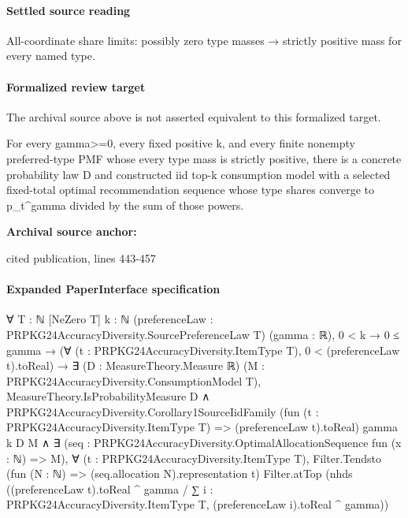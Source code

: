\documentclass[10pt]{article}
\begin{document}
\paragraph{Settled source reading}
\begin{sloppypar}
All-\allowbreak{}coordinate share limits:\allowbreak{} possibly zero type masses → strictly positive mass for every named type.\allowbreak{}
\end{sloppypar}
\paragraph{Formalized review target}
The archival source above is not asserted equivalent to this formalized target.
\begin{ReviewVerbatim}
For every gamma>=0, every fixed positive k, and every finite nonempty preferred-type PMF whose every type mass is strictly positive, there is a concrete probability law D and constructed iid top-k consumption model with a selected fixed-total optimal recommendation sequence whose type shares converge to p_t^gamma divided by the sum of those powers.
\end{ReviewVerbatim}

\textbf{Archival source anchor:} {\footnotesize\raggedright cited publication, lines 443-\allowbreak{}457\par}
\paragraph{Expanded PaperInterface specification}
\begin{ReviewVerbatim}
∀ {T : ℕ} [NeZero T] {k : ℕ} (preferenceLaw : PRPKG24AccuracyDiversity.SourcePreferenceLaw T) (gamma : ℝ),
  0 < k →
    0 ≤ gamma →
      (∀ (t : PRPKG24AccuracyDiversity.ItemType T), 0 < (preferenceLaw t).toReal) →
        ∃ (D : MeasureTheory.Measure ℝ) (M : PRPKG24AccuracyDiversity.ConsumptionModel T),
          MeasureTheory.IsProbabilityMeasure D ∧
            PRPKG24AccuracyDiversity.Corollary1SourceIidFamily
                (fun (t : PRPKG24AccuracyDiversity.ItemType T) => (preferenceLaw t).toReal) gamma k D M ∧
              ∃ (seq : PRPKG24AccuracyDiversity.OptimalAllocationSequence fun (x : ℕ) => M),
                ∀ (t : PRPKG24AccuracyDiversity.ItemType T),
                  Filter.Tendsto (fun (N : ℕ) => (seq.allocation N).representation t) Filter.atTop
                    (nhds
                      ((preferenceLaw t).toReal ^ gamma /
                        ∑ i : PRPKG24AccuracyDiversity.ItemType T, (preferenceLaw i).toReal ^ gamma))
\end{ReviewVerbatim}
\end{document}
